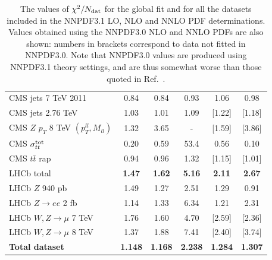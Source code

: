 \begin{table}[h]
\begin{center}
\begin{tabular}{|l|c|c|c||c|c|}
CMS jets 7 TeV 2011     &    0.84      &   0.84   &  0.93            &   1.06   &   0.98  \\    
CMS jets 2.76 TeV    &    1.03      &   1.01   &    1.09          &   [1.22]   &   [1.18]  \\    
CMS $Z$ $p_T$ 8 TeV $(p_T^{ll},M_{ll})$    &    1.32    &   3.65   &   -         &   [1.59]   &   [3.86]  \\    
CMS $\sigma_{tt}^{\rm tot}$     &    0.20      &   0.59   &  53.4            &   0.56   &   0.10  \\    
CMS $t\bar{t}$ rap    &    0.94      &   0.96   &     1.32           &   [1.15]   &   [1.01]  \\
\hline 
LHCb total   &  {\bf  1.47}      &   {\bf 1.62}   &   {\bf 5.16}       &   {\bf 2.11}   &   {\bf 2.67}  \\
LHCb $Z$ 940 pb    &    1.49      &   1.27   &        2.51      &   1.29   &   0.91  \\    
LHCb $Z\to ee$ 2 fb    &    1.14      &   1.33   &    6.34         &   1.21   &   2.31  \\    
LHCb $W,Z \to \mu$ 7 TeV    &    1.76      &   1.60   &   4.70          &   [2.59]   &   [2.36]  \\    
LHCb $W,Z \to \mu$ 8 TeV    &    1.37     &   1.88   &   7.41            &   [2.40]   &   [3.74]  \\    
\hline
\hline
{\bf Total dataset}   &  {\bf  1.148}      & {\bf  1.168}   & {\bf  2.238}        & {\bf  1.284}   & {\bf  1.307}  \\    
\hline
\end{tabular}
\caption{\small
\label{tab:chi2tab_31-nlo-nnlo-30}
  The values of $\chi^2/N_{\rm dat}$ for the global fit and for 
all the datasets included in the NNPDF3.1 LO, NLO
  and NNLO PDF determinations. Values obtained using the NNPDF3.0 NLO and NNLO
  PDFs  are also shown: numbers in brackets correspond 
   to data not fitted in NNPDF3.0. Note that NNPDF3.0 values are
   produced using NNPDF3.1 theory settings, and are thus somewhat
   worse than those quoted in Ref.~\cite{Ball:2014uwa}.
}
\end{center}
\end{table}
